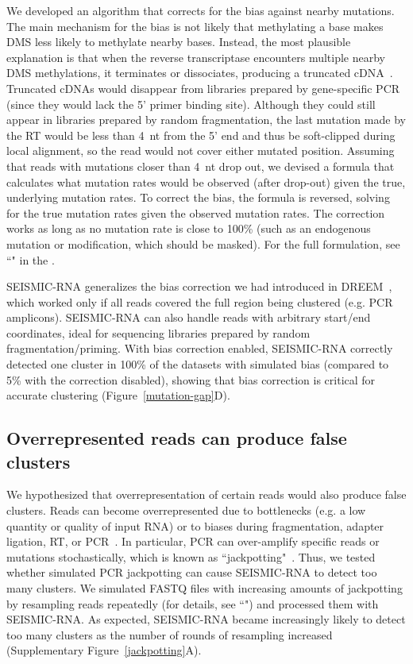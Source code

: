 \documentclass[11pt]{article}
\begin{document}
We developed an algorithm that corrects for the bias against nearby mutations.
The main mechanism for the bias is not likely that methylating a base makes DMS less likely to methylate nearby bases.
Instead, the most plausible explanation is that when the reverse transcriptase encounters multiple nearby DMS methylations, it terminates or dissociates, producing a truncated cDNA~\cite{Sexton2017}.
Truncated cDNAs would disappear from libraries prepared by gene-specific PCR (since they would lack the 5' primer binding site).
Although they could still appear in libraries prepared by random fragmentation, the last mutation made by the RT would be less than 4~nt from the 5' end and thus be soft-clipped during local alignment, so the read would not cover either mutated position.
Assuming that reads with mutations closer than 4~nt drop out, we devised a formula that calculates what mutation rates would be observed (after drop-out) given the true, underlying mutation rates.
To correct the bias, the formula is reversed, solving for the true mutation rates given the observed mutation rates.
The correction works as long as no mutation rate is close to 100\% (such as an endogenous mutation or modification, which should be masked).
For the full formulation, see ``" in the .

SEISMIC-RNA generalizes the bias correction we had introduced in DREEM~\cite{Tomezsko2020}, which worked only if all reads covered the full region being clustered (e.g. PCR amplicons). SEISMIC-RNA can also handle reads with arbitrary start/end coordinates, ideal for sequencing libraries prepared by random fragmentation/priming. With bias correction enabled, SEISMIC-RNA correctly detected one cluster in 100\% of the datasets with simulated bias (compared to 5\% with the correction disabled), showing that bias correction is critical for accurate clustering (Figure~\ref{mutation-gap}D).

\subsection{Overrepresented reads can produce false clusters}
\label{jackpotting-section}

We hypothesized that overrepresentation of certain reads would also produce false clusters.
Reads can become overrepresented due to bottlenecks (e.g. a low quantity or quality of input RNA) or to biases during fragmentation, adapter ligation, RT, or PCR~\cite{Shi2021}.
In particular, PCR can over-amplify specific reads or mutations stochastically, which is known as ``jackpotting"~\cite{Marotz2019}.
Thus, we tested whether simulated PCR jackpotting can cause SEISMIC-RNA to detect too many clusters.
We simulated FASTQ files with increasing amounts of jackpotting by resampling reads repeatedly (for details, see ``") and processed them with SEISMIC-RNA.
As expected, SEISMIC-RNA became increasingly likely to detect too many clusters as the number of rounds of resampling increased (Supplementary Figure~\ref{jackpotting}A).
\end{document}
